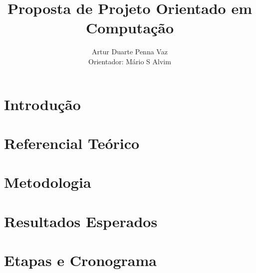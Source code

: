 \documentclass[runningheads,a4paper]{llncs2e/llncs}
\begin{document}
\mainmatter  %

\title{Proposta de Projeto Orientado em Computação}

%
\author{Artur Duarte Penna Vaz\\
Orientador: Mário S Alvim}
%


%
%

\maketitle
\newpage
\section{Introdução}
\label{sec:introducao}


\section{Referencial Teórico}
\label{sec:referencial_teorico}


\section{Metodologia}
\label{sec:metodologia}


\section{Resultados Esperados}
\label{sec:resultados}


\section{Etapas e Cronograma}
\label{sec:etapas}





%
%
\end{document}
